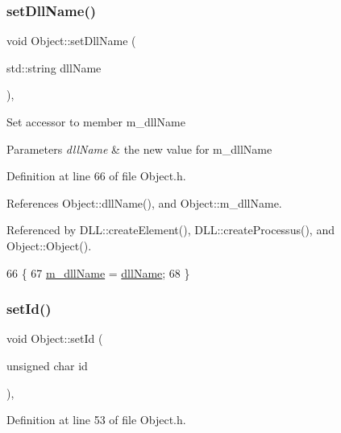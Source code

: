 \subsubsection{\texorpdfstring{set\+Dll\+Name()}{setDllName()}}
{\footnotesize\ttfamily void Object\+::set\+Dll\+Name (\begin{DoxyParamCaption}\item[{std\+::string}]{dll\+Name }\end{DoxyParamCaption})\hspace{0.3cm}{\ttfamily [inline]}, {\ttfamily [inherited]}}

Set accessor to member m\+\_\+dll\+Name 
\begin{DoxyParams}{Parameters}
{\em dll\+Name} & the new value for m\+\_\+dll\+Name \\
\hline
\end{DoxyParams}


Definition at line 66 of file Object.\+h.



References Object\+::dll\+Name(), and Object\+::m\+\_\+dll\+Name.



Referenced by D\+L\+L\+::create\+Element(), D\+L\+L\+::create\+Processus(), and Object\+::\+Object().


\begin{DoxyCode}
66                                       \{
67     \hyperlink{classObject_a01afbeacebb8db6831559972ec362eb3}{m\_dllName} = \hyperlink{classObject_a2e3947f2870094c332d7454117f3ec63}{dllName};
68   \}
\end{DoxyCode}
\mbox{\label{classObject_a398fe08cba594a0ce6891d59fe4f159f}} 
\subsubsection{\texorpdfstring{set\+Id()}{setId()}}
{\footnotesize\ttfamily void Object\+::set\+Id (\begin{DoxyParamCaption}\item[{unsigned char}]{id }\end{DoxyParamCaption})\hspace{0.3cm}{\ttfamily [inline]}, {\ttfamily [inherited]}}



Definition at line 53 of file Object.\+h.




